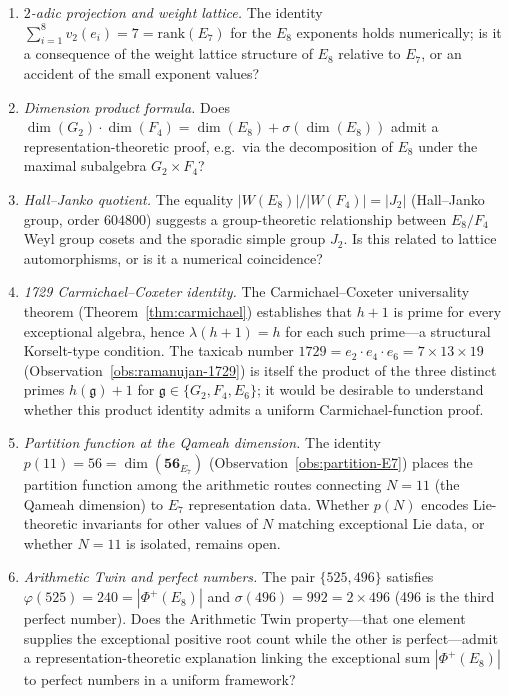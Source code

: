 \documentclass[11pt]{amsart}
\theoremstyle{plain}
\theoremstyle{definition}
\theoremstyle{remark}
\newcommand{\fg}{\mathfrak{g}}
\renewcommand{\Phi}{\varPhi}
\begin{document}
\begin{enumerate}
  \item \emph{$2$-adic projection and weight lattice.}
    The identity $\sum_{i=1}^{8} v_2(e_i) = 7 = \mathrm{rank}(E_7)$
    for the $E_8$ exponents holds numerically; is it a consequence of
    the weight lattice structure of $E_8$ relative to $E_7$, or an
    accident of the small exponent values?

  \item \emph{Dimension product formula.}
    Does $\dim(G_2) \cdot \dim(F_4) = \dim(E_8) + \sigma(\dim(E_8))$
    admit a representation-theoretic proof, e.g.\ via the decomposition
    of $E_8$ under the maximal subalgebra $G_2 \times F_4$?

  \item \emph{Hall--Janko quotient.}
    The equality $|W(E_8)|/|W(F_4)| = |J_2|$ (Hall--Janko group, order
    $604800$) suggests a group-theoretic relationship between $E_8/F_4$
    Weyl group cosets and the sporadic simple group $J_2$.  Is this
    related to lattice automorphisms, or is it a numerical coincidence?

  \item \emph{1729 Carmichael--Coxeter identity.}
    The Carmichael--Coxeter universality theorem
    (Theorem~\ref{thm:carmichael}) establishes that $h+1$ is prime for
    every exceptional algebra, hence $\lambda(h+1) = h$ for each such
    prime---a structural Korselt-type condition.  The taxicab number
    $1729 = e_2 \cdot e_4 \cdot e_6 = 7 \times 13 \times 19$
    (Observation~\ref{obs:ramanujan-1729}) is itself the product of
    the three distinct primes $h(\fg)+1$ for $\fg \in \{G_2, F_4, E_6\}$;
    it would be desirable to understand whether this product identity
    admits a uniform Carmichael-function proof.

  \item \emph{Partition function at the Qameah dimension.}
    The identity $p(11) = 56 = \dim(\mathbf{56}_{E_7})$
    (Observation~\ref{obs:partition-E7}) places the partition function
    among the arithmetic routes connecting $N = 11$ (the Qameah dimension)
    to $E_7$ representation data.  Whether $p(N)$ encodes Lie-theoretic
    invariants for other values of $N$ matching exceptional Lie data, or
    whether $N = 11$ is isolated, remains open.

  \item \emph{Arithmetic Twin and perfect numbers.}
    The pair $\{525, 496\}$ satisfies $\varphi(525) = 240 = |\Phi^+(E_8)|$
    and $\sigma(496) = 992 = 2 \times 496$ (496 is the third perfect number).
    Does the Arithmetic Twin property---that one element supplies the
    exceptional positive root count while the other is perfect---admit a
    representation-theoretic explanation linking the exceptional sum
    $|\Phi^+(E_8)|$ to perfect numbers in a uniform framework?


\end{enumerate}
\end{document}
